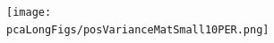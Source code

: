 \documentclass[8pt,xcolor=table]{beamer}
\begin{document}
\begin{frame}
\begin{figure}[H]
\begin{tikzpicture}[scale=\scaleAllSubfigsPcaSubgrTikz,auto,swap]
    \end{tikzpicture}
% 
%     
   \begin{subfigure}{0.31\textwidth}
   \vspace{-6em}
 \texttt{[image: \\pcaLongFigs/posVarianceMatSmall10PER.png]} 
 \end{subfigure}

\end{figure}
\vspace{-1em}

\end{frame}


\newcommand{\figScale}{0.27}
\end{document}
